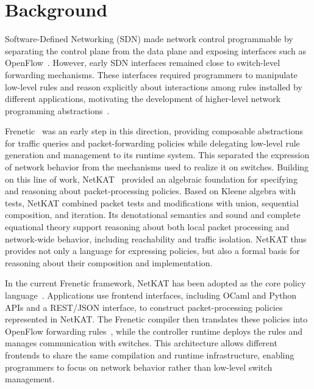 \section{Background}


Software-Defined Networking (SDN) made network control programmable by separating the control plane from the data plane and exposing interfaces such as OpenFlow~\cite{mckeown2008openflow}. However, early SDN interfaces remained close to switch-level forwarding mechanisms. These interfaces required programmers to manipulate low-level rules and reason explicitly about interactions among rules installed by different applications, motivating the development of higher-level network programming abstractions~\cite{foster2011frenetic}.

Frenetic~\cite{foster2011frenetic} was an early step in this direction, providing composable abstractions for traffic queries and packet-forwarding policies while delegating low-level rule generation and management to its runtime system. This separated the expression of network behavior from the mechanisms used to realize it on switches. Building on this line of work, NetKAT~\cite{anderson2014netkat} provided an algebraic foundation for specifying and reasoning about packet-processing policies. Based on Kleene algebra with tests, NetKAT combined packet tests and modifications with union, sequential composition, and iteration. Its denotational semantics and sound and complete equational theory support reasoning about both local packet processing and network-wide behavior, including reachability and traffic isolation. NetKAT thus provides not only a language for expressing policies, but also a formal basis for reasoning about their composition and implementation.

In the current Frenetic framework, NetKAT has been adopted as the core policy language~\cite{freneticsoftware}. Applications use frontend interfaces, including OCaml and Python APIs and a REST/JSON interface, to construct packet-processing policies represented in NetKAT. The Frenetic compiler then translates these policies into OpenFlow forwarding rules~\cite{smolka2015compiler}, while the controller runtime deploys the rules and manages communication with switches. This architecture allows different frontends to share the same compilation and runtime infrastructure, enabling programmers to focus on network behavior rather than low-level switch management.

